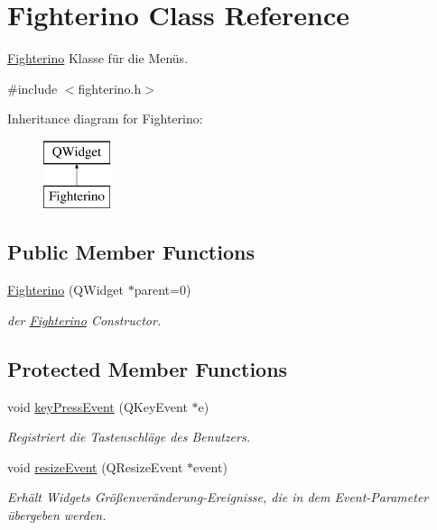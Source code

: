 \hypertarget{class_fighterino}{}\section{Fighterino Class Reference}
\label{class_fighterino}


\hyperlink{class_fighterino}{Fighterino} Klasse für die Menüs.  




{\ttfamily \#include $<$fighterino.\+h$>$}

Inheritance diagram for Fighterino\+:\begin{figure}[H]
\begin{center}
\leavevmode
\includegraphics[height=2.000000cm]{class_fighterino}
\end{center}
\end{figure}
\subsection*{Public Member Functions}
\begin{DoxyCompactItemize}
\item 
\hyperlink{class_fighterino_a133b36eb3731d07d14262c9043f536eb}{Fighterino} (Q\+Widget $\ast$parent=0)
\begin{DoxyCompactList}\small\item\em der \hyperlink{class_fighterino}{Fighterino} Constructor. \end{DoxyCompactList}\end{DoxyCompactItemize}
\subsection*{Protected Member Functions}
\begin{DoxyCompactItemize}
\item 
void \hyperlink{class_fighterino_a59266485815dfc7e13c5cbb0ab3310a8}{key\+Press\+Event} (Q\+Key\+Event $\ast$e)
\begin{DoxyCompactList}\small\item\em Registriert die Tastenschläge des Benutzers. \end{DoxyCompactList}\item 
void \hyperlink{class_fighterino_aa8a42ffd3f2794c406f7d7e80cb45bfd}{resize\+Event} (Q\+Resize\+Event $\ast$event)
\begin{DoxyCompactList}\small\item\em Erhält Widgets Größenveränderung-\/\+Ereignisse, die in dem Event-\/\+Parameter übergeben werden. \end{DoxyCompactList}\end{DoxyCompactItemize}


